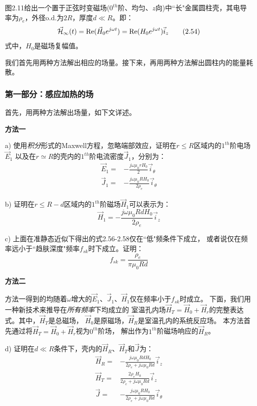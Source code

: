 图2.11给出一个置于正弦时变磁场($0^{th}$阶、均匀、$z$向)中``长"金属圆柱壳，其电导率为$\rho_e$，外径o.d.为$2R$，厚度$d\ll R$。即：
\begin{equation*}
\vec{\CMcal{H}}_\infty(t)=\mathrm{Re}(\vec{H}_0 e^{j\omega t})=\mathrm{Re}(H_0 e^{j\omega t})\vec{i}_z \tag{2.54}
\end{equation*}
式中，$H_0$是磁场复幅值。

我们首先用两种方法解出相应的场量。接下来，再用两种方法解出圆柱内的能量耗散。

\subsubsection*{第一部分：感应加热的场}
首先，用两种方法解出场量，如下文详述。

\textbf{方法一}

a) 使用\textit{积分}形式的Maxwell方程，忽略端部效应，证明在$r\le R$区域内的$1^{th}$阶电场$\vec{E}_1$
以及在$r\simeq R$的壳内的$1^{th}$阶电流密度$\vec{J}_1$，分别为：
\begin{align}
\vec{E}_1=&-\frac{j\omega \mu_0 r H_0}{2} \vec{i}_\theta\\
\vec{J}_1=&-\frac{j\omega \mu_0 R H_0}{2\rho_e} \vec{i}_\theta
\end{align}

b) 证明在$r\le R-d$区域内的$1^{th}$阶磁场$\vec{H}_1$可以表示为：
\begin{equation}
\vec{H}_1=-\frac{j\omega \mu_0 R d H_0}{2\rho_e}\vec{i}_z
\end{equation} 

c) 上面在准静态近似下得出的式2.56-2.58仅在``低"频条件下成立，
或者说仅在频率远小于``趋肤深度"频率$f_{sk}$时下成立。证明：
\begin{equation}
f_{sk}=\frac{\rho_e}{\pi \mu_0 R d}
\end{equation}

\textbf{方法二}

方法一得到的均随着$\omega$增大的$\vec{E}_1$、$\vec{J}_1$、$\vec{H}_1$仅在频率小于$f_{sk}$时成立。
下面，我们用一种新技术来推导在\textit{所有频率}下均成立的
室温孔内场$\vec{H}_T=\vec{H}_0+\vec{H}_r$的完整表达式。其中，$\vec{H}_T$是总磁场，
$\vec{H}_0$是原磁场，$\vec{H}_R$是室温孔内的系统反应场。
本方法首先通过将$\vec{H}_T=\vec{H}_0+\vec{H}_r$视为$0^{th}$阶场，
解出作为$1^{th}$阶磁场响应的$\vec{H}_R$。

d) 证明在$d\ll R$条件下，壳内的$\vec{H}_R$、$\vec{H}_T$和$\vec{J}$为：
\begin{align}
\vec{H}_R=&-\frac{j\omega \mu_0 R d H_0}{2\rho_e+j\omega \mu_0 R d} \vec{i}_z\\
\vec{H}_T=&\frac{2\rho_e H_0}{2\rho_e+j\omega \mu_0 R d} \vec{i}_z\\
\vec{J}=&-\frac{j\omega \mu_0 R H_0}{2\rho_e+j\omega \mu_0 R d} \vec{i}_\theta
\end{align}

